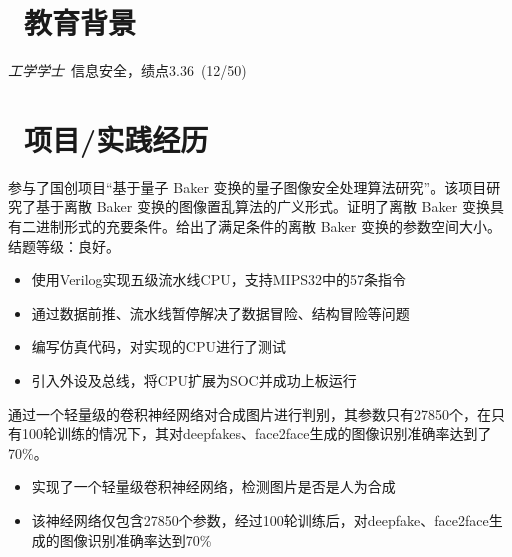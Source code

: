 \documentclass{resume}
\begin{document}


 
\section{\faGraduationCap\  教育背景}
\textit{工学学士}\ 信息安全，绩点3.36\ (12/50)

\section{\faUsers\ 项目/实践经历}
\begin{onehalfspacing}
参与了国创项目“基于量子 Baker 变换的量子图像安全处理算法研究”。该项目研究了基于离散 Baker 变换的图像置乱算法的广义形式。证明了离散 Baker 变换具有二进制形式的充要条件。给出了满足条件的离散 Baker 变换的参数空间大小。结题等级：良好。
\end{onehalfspacing}

\begin{onehalfspacing}
\begin{itemize}
    \item 使用Verilog实现五级流水线CPU，支持MIPS32中的57条指令
    \item 通过数据前推、流水线暂停解决了数据冒险、结构冒险等问题
    \item 编写仿真代码，对实现的CPU进行了测试
    \item 引入外设及总线，将CPU扩展为SOC并成功上板运行
\end{itemize}
\end{onehalfspacing}

\begin{onehalfspacing}
通过一个轻量级的卷积神经网络对合成图片进行判别，其参数只有27850个，在只有100轮训练的情况下，其对deepfakes、face2face生成的图像识别准确率达到了70\%。
\begin{itemize}
  \item 实现了一个轻量级卷积神经网络，检测图片是否是人为合成
  \item 该神经网络仅包含27850个参数，经过100轮训练后，对deepfake、face2face生成的图像识别准确率达到70\%
\end{itemize}
\end{onehalfspacing}
\end{document}
